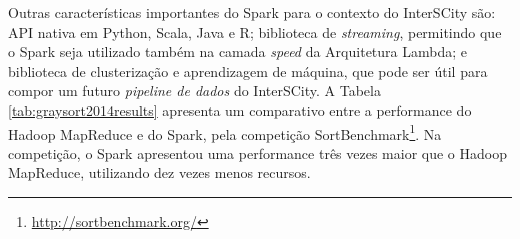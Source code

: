 Outras características importantes do Spark para o contexto do
InterSCity são: API nativa em Python, Scala, Java e R; biblioteca de
\textit{streaming}, permitindo que o Spark seja utilizado também na camada
\textit{speed} da Arquitetura Lambda; e biblioteca de clusterização e
aprendizagem de máquina, que pode ser útil para compor um futuro \textit{pipeline
de dados} do InterSCity. A Tabela \ref{tab:graysort2014results} apresenta
um comparativo entre a performance do Hadoop MapReduce e do Spark, pela
competição SortBenchmark\footnote{\url{http://sortbenchmark.org/}}. Na
competição, o Spark apresentou uma performance três vezes maior que o Hadoop
MapReduce, utilizando dez vezes menos recursos.

\begin{table}[!htbp]
    \centering
    \caption[Resultados da Sort Benchmark 2014, categoria GraySort]{Resultados da Sort Benchmark 2014, categoria GraySort. Fonte: Databricks, 2014\footnotemark.}
    \label{tab:graysort2014results}
\end{table}

